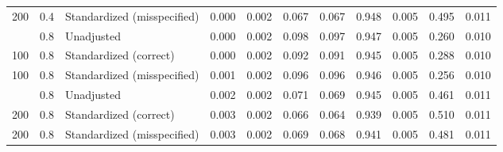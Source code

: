 \documentclass[
  11pt,
]{article}
\begin{document}
\begin{table}[!h]
{\begin{tabular}[t]{rrlrrrrrrrr}
200 & 0.4 & Standardized (misspecified) & 0.000 & 0.002 & 0.067 & 0.067 & 0.948 & 0.005 & 0.495 & 0.011\\
\addlinespace
100 & 0.8 & Unadjusted & 0.000 & 0.002 & 0.098 & 0.097 & 0.947 & 0.005 & 0.260 & 0.010\\
100 & 0.8 & Standardized (correct) & 0.000 & 0.002 & 0.092 & 0.091 & 0.945 & 0.005 & 0.288 & 0.010\\
100 & 0.8 & Standardized (misspecified) & 0.001 & 0.002 & 0.096 & 0.096 & 0.946 & 0.005 & 0.256 & 0.010\\
\addlinespace
200 & 0.8 & Unadjusted & 0.002 & 0.002 & 0.071 & 0.069 & 0.945 & 0.005 & 0.461 & 0.011\\
200 & 0.8 & Standardized (correct) & 0.003 & 0.002 & 0.066 & 0.064 & 0.939 & 0.005 & 0.510 & 0.011\\
200 & 0.8 & Standardized (misspecified) & 0.003 & 0.002 & 0.069 & 0.068 & 0.941 & 0.005 & 0.481 & 0.011\\
\bottomrule
\end{tabular}}
\end{table}
\end{document}
